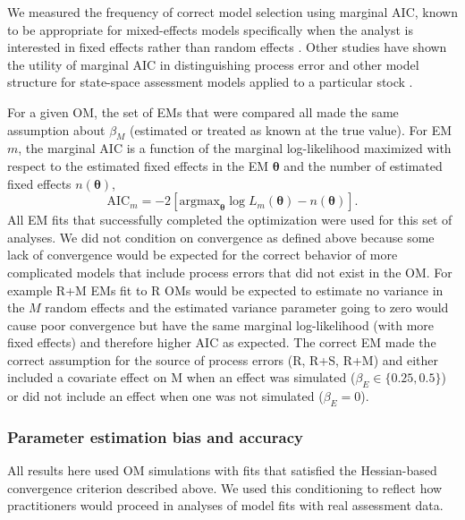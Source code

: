 \documentclass[
  12pt,
]{article}
\begin{document}
We measured the frequency of correct model selection using marginal AIC, known to be appropriate for mixed-effects models specifically when the analyst is interested in fixed effects rather than random effects \citep{vaidablanchard05}. Other studies have shown the utility of marginal AIC in distinguishing process error and other model structure for state-space assessment models applied to a particular stock \citep{millerhyun18, stockmiller21}.

For a given OM, the set of EMs that were compared all made the same assumption about \(\beta_M\) (estimated or treated as known at the true value). For EM \(m\), the marginal AIC is a function of the marginal log-likelihood maximized with respect to the estimated fixed effects in the EM \(\boldsymbol{\theta}\) and the number of estimated fixed effects \(n\left(\boldsymbol{\theta}\right)\),
\[
\text{AIC}_m = -2\left[{\text{argmax}}_{\boldsymbol{\theta}} \log L_m\left({\boldsymbol{\theta}}\right) - n\left({\boldsymbol{\theta}}\right)\right].
\]
All EM fits that successfully completed the optimization were used for this set of analyses. We did not condition on convergence as defined above because some lack of convergence would be expected for the correct behavior of more complicated models that include process errors that did not exist in the OM. For example R+M EMs fit to R OMs would be expected to estimate no variance in the \(M\) random effects and the estimated variance parameter going to zero would cause poor convergence but have the same marginal log-likelihood (with more fixed effects) and therefore higher AIC as expected. The correct EM made the correct assumption for the source of process errors (R, R+S, R+M) and either included a covariate effect on M when an effect was simulated (\(\beta_E \in \{0.25,0.5\}\)) or did not include an effect when one was not simulated (\(\beta_E = 0\)).

\subsubsection*{Parameter estimation bias and accuracy}\label{parameter-estimation-bias-and-accuracy}

All results here used OM simulations with fits that satisfied the Hessian-based convergence criterion described above. We used this conditioning to reflect how practitioners would proceed in analyses of model fits with real assessment data.
\end{document}
